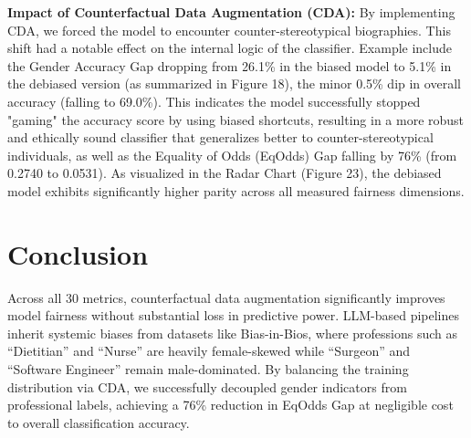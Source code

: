\documentclass[11pt,letterpaper,twocolumn]{article}
\begin{document}
	\textbf{Impact of Counterfactual Data Augmentation (CDA):}
	By implementing CDA, we forced the model to encounter counter-stereotypical biographies. This shift had a notable effect on the internal logic of the classifier. Example include the Gender Accuracy Gap dropping from 26.1\% in the biased model to 5.1\% in the debiased version (as summarized in Figure 18), the minor 0.5\% dip in overall accuracy (falling to 69.0\%). This indicates the model successfully stopped "gaming" the accuracy score by using biased shortcuts, resulting in a more robust and ethically sound classifier that generalizes better to counter-stereotypical individuals, as well as the Equality of Odds (EqOdds) Gap falling by 76\% (from 0.2740 to 0.0531). As visualized in the Radar Chart (Figure 23), the debiased model exhibits significantly higher parity across all measured fairness dimensions.
	
	\section{Conclusion}
	Across all 30 metrics, counterfactual data augmentation significantly improves model
	fairness without substantial loss in predictive power. LLM-based pipelines inherit
	systemic biases from datasets like Bias-in-Bios, where professions such as ``Dietitian''
	and ``Nurse'' are heavily female-skewed while ``Surgeon'' and ``Software Engineer''
	remain male-dominated. By balancing the training distribution via CDA, we successfully
	decoupled gender indicators from professional labels, achieving a 76\% reduction in
	EqOdds Gap at negligible cost to overall classification accuracy.
	
\end{document}
